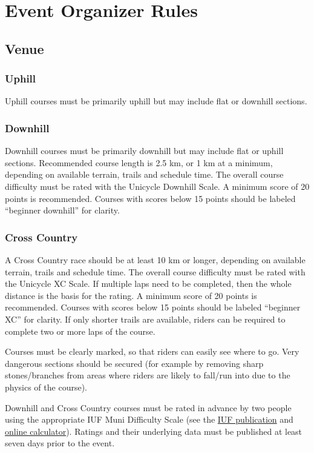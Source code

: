 \chapter{Event Organizer Rules}

\section{Venue}

\subsection{Uphill}
Uphill courses must be primarily uphill but may include flat or downhill sections.

\subsection{Downhill}
Downhill courses must be primarily downhill but may include flat or uphill sections.
Recommended course length is 2.5 km, or 1 km at a minimum, depending on available terrain, trails and schedule time.
The overall course difficulty must be rated with the Unicycle Downhill Scale.
A minimum score of 20 points is recommended.
Courses with scores below 15 points should be labeled ``beginner downhill'' for clarity.

\subsection{Cross Country}
A Cross Country race should be at least 10 km or longer, depending on available terrain, trails and schedule time.
The overall course difficulty must be rated with the Unicycle XC Scale.
If multiple laps need to be completed, then the whole distance is the basis for the rating.
A minimum score of  20 points is  recommended. Courses with scores below 15 points should be labeled ``beginner XC'' for clarity.
If only shorter trails are available, riders can be required to complete two or more laps of the course.

Courses must be clearly marked, so that riders can easily see where to go.
Very dangerous sections should be secured (for example by removing sharp stones/branches from areas where riders are likely to fall/run into due to the physics of the course).

Downhill and Cross Country courses must be rated in advance by two people using the appropriate IUF Muni Difficulty Scale (see the \href{https://unicycling.org/files/iuf-muni-difficulty-scale.pdf}{IUF publication} and \href{https://muni-scale.info/}{online calculator}).
Ratings and their underlying data must be published at least seven days prior to the event.

